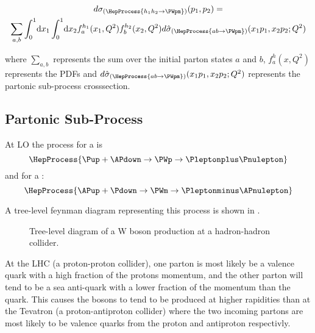 \begin{multline}
  d\sigma_{(\HepProcess{h_1 h_2 \to \PWpm})}(p_1,p_2) = \\
  \sum\limits_{a,b}
  \int_0^1 \! \mathrm{d} x_1 
  \int_0^1 \! \mathrm{d} x_2 
  f_a^{h_1}(x_1,Q^2)
  f_b^{h_2}(x_2,Q^2) 
  d\hat{\sigma}_{(\HepProcess{a b \to \PWpm})}(x_1 p_1, x_2 p_2; Q^2)
  \label{wbos:xsec}
\end{multline}

where $\sum\limits_{a,b}$ represents the sum over the initial parton states $a$
and $b$, $f_a^{h}(x,Q^2)$ represents the \acp{PDF} and
$d\hat{\sigma}_{(\HepProcess{a b \to \PWpm})}(x_1 p_1, x_2 p_2; Q^2)$
represents the partonic sub-process crosssection.

\subsection*{Partonic Sub-Process}

At \ac{LO} the process for a \PWp is
\begin{equation}
  \HepProcess{\Pup + \APdown \to \PWp \to \Pleptonplus \Pnulepton} 
  \label{wbos:wpprod} 
\end{equation}
and for a \PWm:
\begin{equation}
  \HepProcess{\APup + \Pdown \to \PWm \to \Pleptonminus \APnulepton}
  \label{wbos:wmprod} 
\end{equation}

A tree-level feynman diagram representing this process is shown in
.

\begin{figure}[htb]
  \centering
  \caption{Tree-level diagram of a W boson production at a hadron-hadron collider.}
  \label{wbos:feynman}
\end{figure}

At the \ac{LHC} (a proton-proton collider), one parton is most likely be a
valence quark with a high fraction of the protons momentum, and the other
parton will tend to be a sea anti-quark with a lower fraction of the momentum
than the quark. This causes the \PW bosons to tend to be produced at higher
rapidities than at the Tevatron (a proton-antiproton collider) where the two
incoming partons are most likely to be valence quarks from the proton and
antiproton respectivly.


